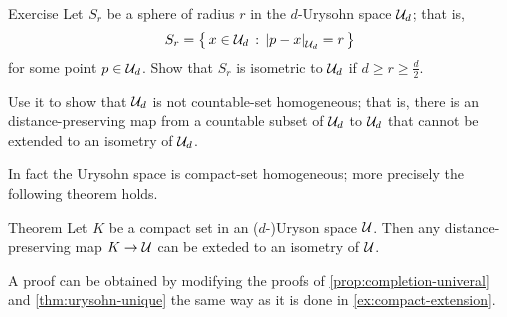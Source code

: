 \begin{thm}{Exercise}\label{ex:sphere-in-urysohn}
Let $S_r$ be a sphere of radius $r$ in the $d$-Urysohn space $\mathcal{U}_d$;
that is, 
\[S_r=\set{x\in \spc{U}_d}{\dist{p}{x}{\spc{U}_d}=r}\]
for some point $p\in \mathcal{U}_d$.
Show that $S_r$ is isometric to $\mathcal{U}_d$ if $d\ge r\ge \tfrac d2$.

Use it to show that $\mathcal{U}_d$ is not countable-set homogeneous;
that is, there is an distance-preserving map from a countable subset of $\mathcal{U}_d$ to $\mathcal{U}_d$ that cannot be extended to an isometry of $\mathcal{U}_d$.
\end{thm}

In fact the Urysohn space is compact-set homogeneous; more precisely the following theorem holds.

\begin{thm}{Theorem}\label{thm:compact-homogeneous}
Let $K$ be a compact set in an ($d$-)Uryson space $\mathcal{U}$.
Then any distance-preserving map $K\to \mathcal{U}$ can be exteded to an isometry of $\mathcal{U}$.
\end{thm}

A proof can be obtained by modifying the proofs of \ref{prop:completion-univeral} and \ref{thm:urysohn-unique}
the same way as it is done in \ref{ex:compact-extension}.










